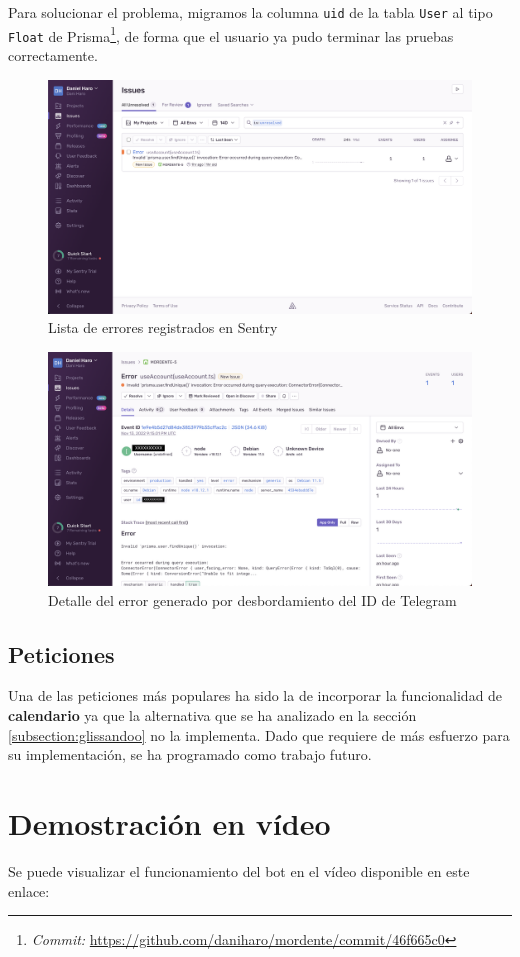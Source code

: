 Para solucionar el problema, migramos la columna \texttt{uid} de la tabla \texttt{User} al tipo \texttt{Float} de Prisma\footnote{\textit{Commit:} \url{https://github.com/daniharo/mordente/commit/46f665c0}}, de forma que el usuario ya pudo terminar las pruebas correctamente.

\begin{figure}[h]
\centering
\includegraphics[width=\textwidth]{imagenes/pruebas/sentry_error_uid.png}
\caption{Lista de errores registrados en Sentry}
\label{fig:sentryListaErrores}
\end{figure}

\begin{figure}[h]
\centering
\includegraphics[width=\textwidth]{imagenes/pruebas/sentry_detalle_error_uid.png}
\caption{Detalle del error generado por desbordamiento del ID de Telegram}
\label{fig:sentryDetalleError}
\end{figure}

\subsection{Peticiones}

Una de las peticiones más populares ha sido la de incorporar la funcionalidad de \textbf{calendario} ya que la alternativa que se ha analizado en la sección \ref{subsection:glissandoo} no la implementa. Dado que requiere de más esfuerzo para su implementación, se ha programado como trabajo futuro.


\section{Demostración en vídeo}

Se puede visualizar el funcionamiento del bot en el vídeo disponible en este enlace:
\url{}

